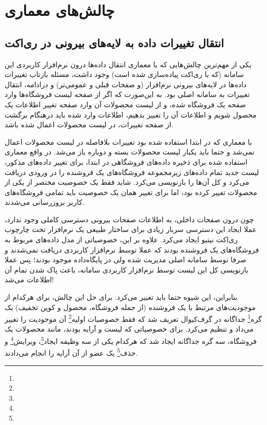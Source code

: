 \section{چالش‌های معماری}

\subsection{انتقال تغییرات داده به لایه‌های بیرونی در ری‌اکت}

یکی از مهم‌ترین چالش‌هایی که با معماری انتقال داده‌ها درون نرم‌افزار کاربردی این سامانه (که با ری‌اکت پیاده‌سازی شده است) وجود داشت،‌ مسئله بازتاب تغییرات داده‌ها در لایه‌های بیرونی نرم‌افزار (و صفحات قبلی و عمومی‌تر) و درادامه، انتقال تغییرات به سامانه اصلی بود. به این‌صورت که اگر از صفحه لیست فروشگاه‌ها وارد صفحه یک فروشگاه شده، و از لیست محصولات آن وارد صفحه تغییر اطلاعات یک محصول شویم و اطلاعات آن را تغییر بدهیم، اطلاعات وارد شده باید درهنگام برگشت از صفحه تغییرات، در لیست محصولات اعمال شده باشد.

با معماری که در ابتدا استفاده شده بود تغییرات بلافاصله در لیست محصولات اعمال نمی‌شد و حتما باید یکبار لیست محصولات بسته و دوباره باز می‌شد. در واقع‌ معماری استفاده شده برای ذخیره داده‌های فروشگاهی در ابتدا، برای تغییر داده‌های مذکور، لیست جدید تمام داده‌های زیرمجموعه فروشگاه‌های یک فروشنده را در ورودی دریافت می‌کرد و کل آن‌ها را بازنویسی می‌کرد. شاید فقط یک خصوصیت مختصر از یکی از محصولات تغییر کرده بود، اما برای تغییر همان یک خصوصیت باید تمامی فروشگاه‌های کاربر بروزرسانی می‌شدند.

چون درون صفحات داخلی، به اطلاعات صفحات بیرونی دسترسی کاملی وجود ندارد،‌ عملا ایجاد این دسترسی سربار زیادی برای ساختار طبیعی یک نرم‌افزار تحت چارچوب ری‌اکت نیتیو ایجاد می‌کرد. علاوه بر این، خصوصیاتی از مدل داده‌های مربوط به فروشگاه‌های یک فروشنده بودند که عملا توسط نرم‌افزار کاربردی دریافت نمی‌شدند و صرفا توسط سامانه اصلی مدیریت شده ولی در پایگاه‌داده موجود بودند؛ پس عملا بازنویسی کل این لیست توسط نرم‌افزار کاربردی سامانه، باعث پاک شدن تمام آن اطلاعات می‌شد!

بنابراین، این شیوه حتما باید تغییر می‌کرد. برای حل این چالش، برای هرکدام از موجودیت‌های مرتبط با یک فروشنده (از جمله فروشگاه، محصول و کوپن تخفیف) یک گره\footnote{} جداگانه در گرف‌کیوال تعریف شد که فقط خصوصیات اولیه\footnote{} آن موجودیت را تغییر می‌داد و تنظیم می‌کرد. برای خصوصیاتی که لیست و آرایه بودند، مانند محصولات یک فروشگاه، سه گره جداگانه ایجاد شد که هرکدام یکی از سه وظیفه ایجاد\footnote{}، ویرایش\footnote{} و حذف\footnote{} یک عضو از آن آرایه را انجام می‌دادند.

